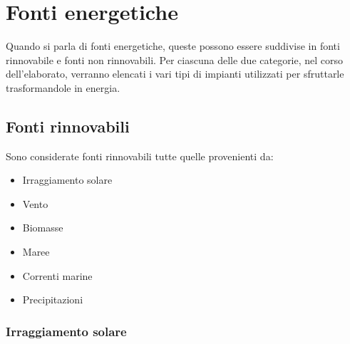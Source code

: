 
\chapter{Fonti energetiche}
\label{chp:FontiEnergetiche}
Quando si parla di fonti energetiche, queste possono essere suddivise in fonti rinnovabile e fonti non rinnovabili. Per ciascuna delle due categorie, nel corso dell'elaborato, verranno elencati i vari tipi di impianti utilizzati per sfruttarle trasformandole in energia. 

\section{Fonti rinnovabili}
Sono considerate fonti rinnovabili tutte quelle provenienti da:
\begin{itemize}
    \item Irraggiamento solare
    \item Vento
    \item Biomasse
    \item Maree
    \item Correnti marine
    \item Precipitazioni
\end{itemize}
\subsection{Irraggiamento solare}

